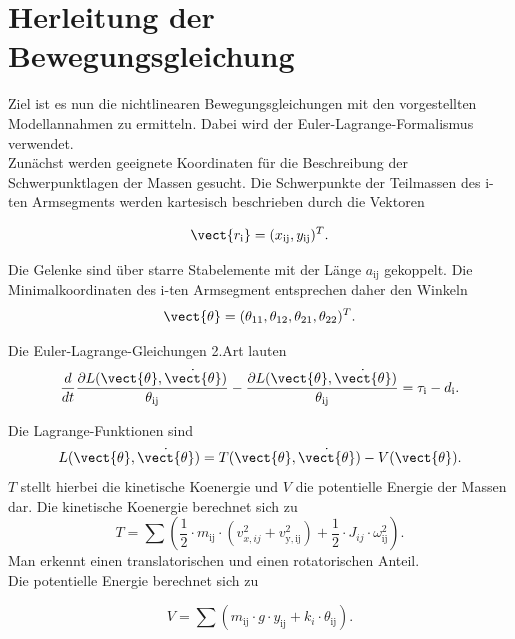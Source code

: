 \section{Herleitung der Bewegungsgleichung}
Ziel ist es nun die nichtlinearen Bewegungsgleichungen mit den vorgestellten Modellannahmen zu ermitteln. Dabei wird der Euler-Lagrange-Formalismus verwendet.\\ 
Zunächst werden geeignete Koordinaten für die Beschreibung der Schwerpunktlagen der Massen gesucht. Die Schwerpunkte der Teilmassen des i-ten Armsegments werden kartesisch beschrieben durch die Vektoren

\begin{equation}
\vect{r_\mathrm{i}}=(x_\mathrm{ij},y_\mathrm{ij})^T.
\end{equation}

Die Gelenke sind über starre Stabelemente mit der Länge $a_\mathrm{ij}$ gekoppelt. Die Minimalkoordinaten des i-ten Armsegment entsprechen daher den Winkeln
\begin{equation}
\vect{\theta} = (\theta_\mathrm{11},\theta_\mathrm{12},\theta_\mathrm{21},\theta_\mathrm{22})^T.
\end{equation}

Die Euler-Lagrange-Gleichungen 2.Art lauten
\begin{equation}
\dfrac{d}{dt}\dfrac{\partial L(\vect{\theta},\dot{\vect{\theta}})}{\theta_\mathrm{ij}}-\dfrac{\partial L(\vect{\theta},\dot{\vect{\theta}})}{\theta_\mathrm{ij}}=\tau_\mathrm{i}-d_\mathrm{i}.
\label{eq:lagr}
\end{equation}

Die Lagrange-Funktionen sind
\begin{equation}
L(\vect{\theta},\dot{\vect{\theta}})=T(\vect{\theta},\dot{\vect{\theta}})-V(\vect{\theta}).
\end{equation}
$T$ stellt hierbei die kinetische Koenergie und $V$ die potentielle Energie der Massen dar.
Die kinetische Koenergie berechnet sich zu 
\begin{equation}
T = \sum \left( \dfrac{1}{2}\cdot m_\mathrm{ij}\cdot(v^2_{x,ij}+v^2_\mathrm{y,ij})+\dfrac{1}{2}\cdot J_{ij}\cdot\omega_\mathrm{ij}^2 \right).
\end{equation}
Man erkennt einen translatorischen und einen rotatorischen Anteil.\\
Die potentielle Energie berechnet sich zu 

\begin{equation}
V = \sum \left( m_\mathrm{ij}\cdot g \cdot y_\mathrm{ij} + k_i \cdot \theta_\mathrm{ij} \right).
\end{equation}

